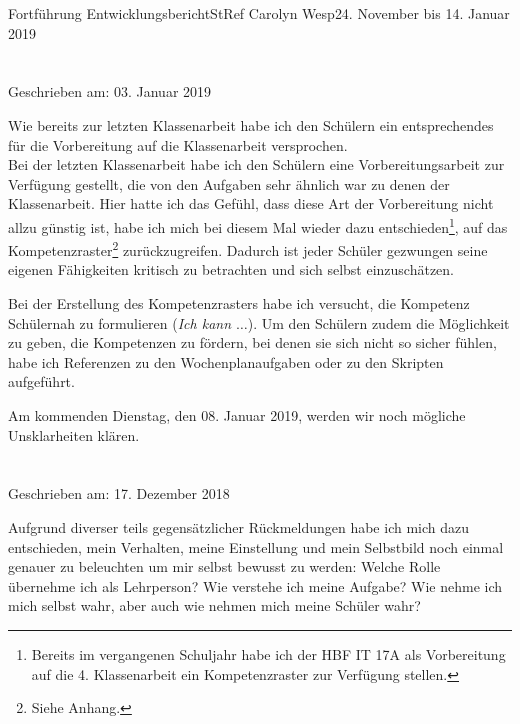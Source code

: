\documentclass[oneside,openany,headings=optiontotoc,11pt,numbers=noenddot]{article}
\begin{document}
	\begin{worksheet}{Fortführung Entwicklungsbericht}{StRef\grq{} Carolyn Wesp}{24. November bis 14. Januar 2019}
		\small
		\section*{}
		\tiny{Geschrieben am: 03. Januar 2019}\small\\
		\par\noindent
		Wie bereits zur letzten Klassenarbeit habe ich den Schülern ein entsprechendes für die Vorbereitung auf die Klassenarbeit versprochen.\\
		Bei der letzten Klassenarbeit habe ich den Schülern eine Vorbereitungsarbeit zur Verfügung gestellt, die von den Aufgaben sehr ähnlich war zu denen der Klassenarbeit. Hier hatte ich das Gefühl, dass diese Art der Vorbereitung nicht allzu günstig ist, habe ich mich bei diesem Mal wieder dazu entschieden\footnote{Bereits im vergangenen Schuljahr habe ich der HBF IT 17A als Vorbereitung auf die 4. Klassenarbeit ein Kompetenzraster zur Verfügung stellen.}, auf das Kompetenzraster\footnote{Siehe Anhang.} zurückzugreifen. Dadurch ist jeder Schüler gezwungen seine eigenen Fähigkeiten kritisch zu betrachten und sich selbst einzuschätzen.\\
		\par\noindent
		Bei der Erstellung des Kompetenzrasters habe ich versucht, die Kompetenz Schülernah zu formulieren (\glqq{}\textit{Ich kann $\ldots$}\grqq{}). Um den Schülern zudem die Möglichkeit zu geben, die Kompetenzen zu fördern, bei denen sie sich nicht so sicher fühlen, habe ich Referenzen zu den Wochenplanaufgaben oder zu den Skripten aufgeführt.\\
		\par\noindent
		Am kommenden Dienstag, den 08. Januar 2019, werden wir noch mögliche Unsklarheiten klären.
		
		\section*{}
		\tiny{Geschrieben am: 17. Dezember 2018}\small\\
		\par\noindent
		Aufgrund diverser teils gegensätzlicher Rückmeldungen habe ich mich dazu entschieden, mein Verhalten, meine Einstellung und mein Selbstbild noch einmal genauer zu beleuchten um mir selbst bewusst zu werden: Welche Rolle übernehme ich als Lehrperson? Wie verstehe ich meine Aufgabe? Wie nehme ich mich selbst wahr, aber auch wie nehmen mich meine Schüler wahr?

\end{worksheet}
\end{document}
